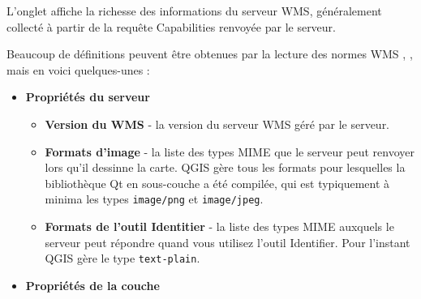 L'onglet  affiche la richesse des informations du serveur WMS,
généralement collecté à partir de la requête Capabilities renvoyée par le
serveur.

Beaucoup de définitions peuvent être obtenues par la lecture des normes WMS
\cite{OGCWMS010101web}, \cite{OGCWMS010300web}, mais en voici quelques-unes :

\begin{itemize}
\item \textbf{Propriétés du serveur}

\begin{itemize}
\item \textbf{Version du WMS}      - la version du serveur WMS géré par le
serveur.

\item \textbf{Formats d'image}    - la liste des types MIME que le serveur peut
renvoyer lors qu'il dessinne la carte. QGIS gère tous les formats pour
lesquelles la bibliothèque Qt en sous-couche a été compilée, qui est
typiquement à minima les types \texttt{image/png} et \texttt{image/jpeg}.

\item \textbf{Formats de l'outil Identitier} - la liste des types
MIME auxquels le serveur peut répondre quand vous utilisez l'outil
Identifier. Pour l'instant QGIS gère le type \texttt{text-plain}.
\end{itemize}

\item \textbf{Propriétés de la couche}


\end{itemize}
